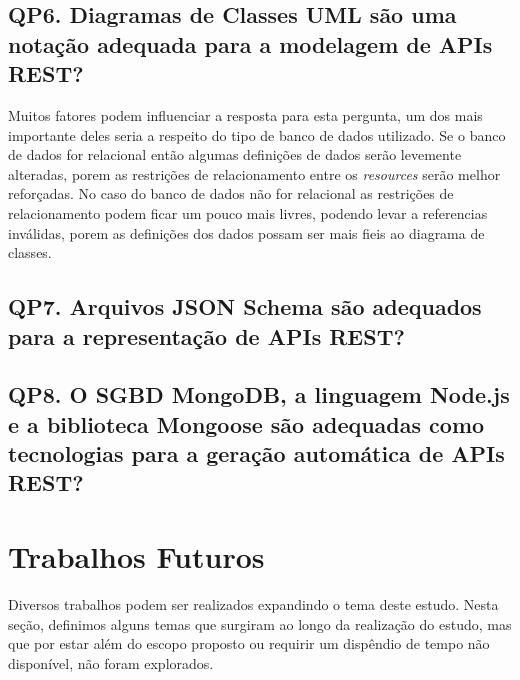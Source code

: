 \subsection{QP6. Diagramas de Classes UML são uma notação adequada para a modelagem de APIs REST?}

Muitos fatores podem influenciar a resposta para esta pergunta, um dos mais importante deles seria a respeito do tipo de banco de dados utilizado. Se o banco de dados for relacional então algumas definições de dados serão levemente alteradas, porem as restrições de relacionamento entre os \textit{resources} serão melhor reforçadas. No caso do banco de dados não for relacional as restrições de relacionamento podem ficar um pouco mais livres, podendo levar a referencias inválidas, porem as definições dos dados possam ser mais fieis ao diagrama de classes.

\subsection{QP7. Arquivos JSON Schema são adequados para a representação de APIs REST?}

\subsection{QP8. O SGBD MongoDB, a linguagem Node.js e a biblioteca Mongoose são adequadas como tecnologias para a geração automática de APIs REST?}


\section{Trabalhos Futuros}

Diversos trabalhos podem ser realizados expandindo o tema deste estudo. Nesta seção, definimos alguns temas que surgiram ao longo da realização do estudo, mas que por estar além do escopo proposto ou requirir um dispêndio de tempo não disponível, não foram explorados.

